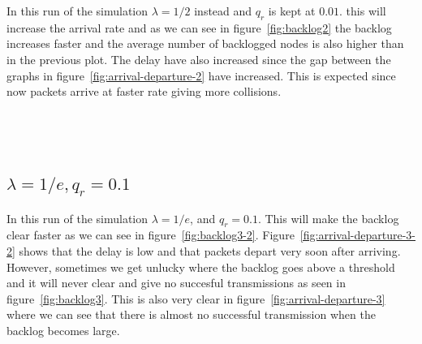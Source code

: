 \documentclass{article}
\begin{document}
In this run of the simulation $\lambda=1/2$ instead and $q_r$ is kept at $0.01$. this will increase the arrival rate and as we can see in figure~\ref{fig:backlog2} the backlog increases faster and the average number of backlogged nodes is also higher than in the previous plot. The delay have also increased since the gap between the graphs in figure~\ref{fig:arrival-departure-2} have increased. This is expected since now packets arrive at faster rate giving more collisions.\\\\\\\\

\subsection{$\lambda = 1/e, q_r = 0.1$}
In this run of the simulation $\lambda=1/e$, and $q_r=0.1$. This will make the backlog clear faster as we can see in figure~\ref{fig:backlog3-2}. Figure~\ref{fig:arrival-departure-3-2} shows that the delay is low and that packets depart very soon after arriving. However, sometimes we get unlucky where the backlog goes above a threshold and it will never clear and give no succesful transmissions as seen in figure~\ref{fig:backlog3}. This is also very clear in figure~\ref{fig:arrival-departure-3} where we can see that there is almost no successful transmission when the backlog becomes large.
\end{document}
